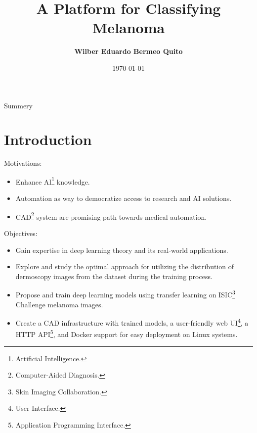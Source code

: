 \documentclass[dvipsnames,mathserif]{beamer}
\begin{document}
  \rightskip\rightmargin
  \title{A Platform for Classifying Melanoma}
  \author{ \Large \textbf{Wilber Eduardo Bermeo Quito} }
  \footnotesize{\date{\today }


    \begin{frame}
      \maketitle
    \end{frame}

    \begin{frame}{ Summery}
      \footnotesize \tableofcontents
    \end{frame}

    \section{Introduction}



    \begin{frame}
      \large Motivations:
      \begin{itemize}

        \item Enhance AI\footnote{Artificial Intelligence.} knowledge.

        \item Automation as way to democratize access to research and AI solutions.

        \item CAD\footnote{Computer-Aided Diagnosis.} system are promising path
          towards medical automation.

      \end{itemize}
    \end{frame}


    \begin{frame}
      \large Objectives:

      \begin{itemize}
        \item Gain expertise in deep learning theory and its real-world
          applications.
        \item Explore and study the optimal approach for utilizing the distribution
          of dermoscopy images from the dataset during the training process.
        \item Propose and train deep learning models using transfer learning on ISIC\footnote{Skin Imaging Collaboration.}
          Challenge melanoma images.
        \item Create a CAD infrastructure with trained models, a user-friendly
          web UI\footnote{User Interface.}, a HTTP API\footnote{Application
          Programming Interface.}, and Docker support for easy deployment on
          Linux systems.
      \end{itemize}
    \end{frame}

}
\end{document}

